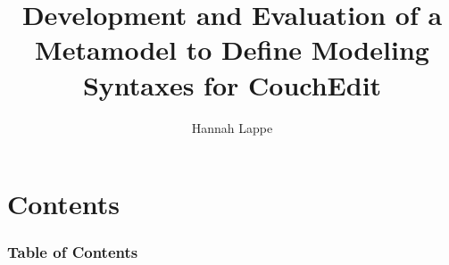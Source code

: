 \documentclass{beamer}
\title{Development and Evaluation of a Metamodel to Define Modeling Syntaxes for CouchEdit}
\author{Hannah Lappe}
\institute
{Institut für Softwaretechnik und Programmiersprachen\\}
\begin{document}
\hspace*{-1.49cm}
\frame[plain]{\titlepage}

\hspace*{-0.7cm}
\section*{Contents} %
\begin{frame}
  \frametitle{Table of Contents}
  \tableofcontents
\end{frame}



\end{document}
